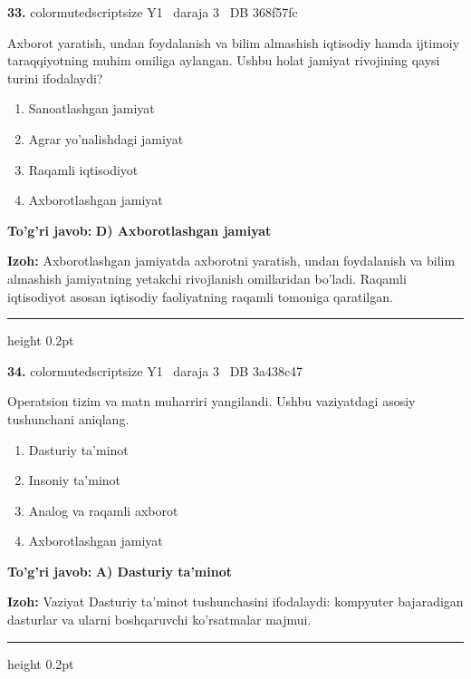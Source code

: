 \documentclass[10pt,a4paper,oneside]{article}
\begin{document}
\noindent\textbf{\color{ink}33.}  {color{muted}scriptsize Y1 \textbullet\ daraja 3 \textbullet\ DB 368f57fc}
\par
Axborot yaratish, undan foydalanish va bilim almashish iqtisodiy hamda ijtimoiy taraqqiyotning muhim omiliga aylangan. Ushbu holat jamiyat rivojining qaysi turini ifodalaydi?
\begin{enumerate}[label=\Alph*),leftmargin=9mm]
\item Sanoatlashgan jamiyat
\item Agrar yo'nalishdagi jamiyat
\item Raqamli iqtisodiyot
\item Axborotlashgan jamiyat
\end{enumerate}
\begin{tcolorbox}[enhanced,breakable,colback=teal!4,colframe=teal!50!black,boxrule=0.5pt,arc=1.1mm,left=3mm,right=3mm,top=1.7mm,bottom=1.7mm,before skip=2mm,after skip=2mm]
\textbf{\color{teal}To'g'ri javob:} \textbf{D) Axborotlashgan jamiyat}
\par\smallskip
\textbf{Izoh:} Axborotlashgan jamiyatda axborotni yaratish, undan foydalanish va bilim almashish jamiyatning yetakchi rivojlanish omillaridan bo'ladi. Raqamli iqtisodiyot asosan iqtisodiy faoliyatning raqamli tomoniga qaratilgan.
\end{tcolorbox}
\vspace{2mm}\hrule height 0.2pt \vspace{3mm}

\noindent\textbf{\color{ink}34.}  {color{muted}scriptsize Y1 \textbullet\ daraja 3 \textbullet\ DB 3a438c47}
\par
Operatsion tizim va matn muharriri yangilandi. Ushbu vaziyatdagi asosiy tushunchani aniqlang.
\begin{enumerate}[label=\Alph*),leftmargin=9mm]
\item Dasturiy ta'minot
\item Insoniy ta'minot
\item Analog va raqamli axborot
\item Axborotlashgan jamiyat
\end{enumerate}
\begin{tcolorbox}[enhanced,breakable,colback=teal!4,colframe=teal!50!black,boxrule=0.5pt,arc=1.1mm,left=3mm,right=3mm,top=1.7mm,bottom=1.7mm,before skip=2mm,after skip=2mm]
\textbf{\color{teal}To'g'ri javob:} \textbf{A) Dasturiy ta'minot}
\par\smallskip
\textbf{Izoh:} Vaziyat Dasturiy ta'minot tushunchasini ifodalaydi: kompyuter bajaradigan dasturlar va ularni boshqaruvchi ko'rsatmalar majmui.
\end{tcolorbox}
\vspace{2mm}\hrule height 0.2pt \vspace{3mm}
\end{document}

